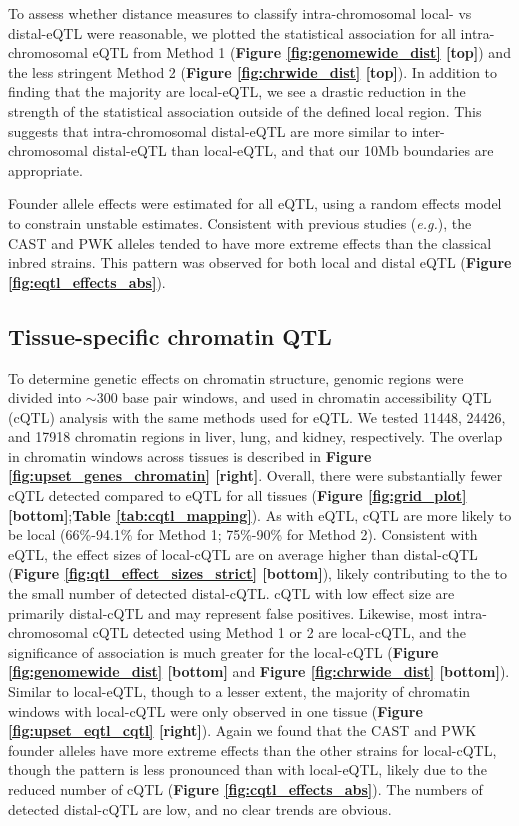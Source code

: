 \documentclass[9pt,twocolumn,twoside]{gsajnl}
\newcommand{\eg}{\emph{e.g.}}
\begin{document}
To assess whether distance measures to classify intra-chromosomal local- vs distal-eQTL were reasonable, we plotted the statistical association for all intra-chromosomal eQTL from Method 1 (\textbf{Figure \ref{fig:genomewide_dist} [top]}) and the less stringent Method 2 (\textbf{Figure \ref{fig:chrwide_dist} [top]}). In addition to finding that the majority are local-eQTL, we see a drastic reduction in the strength of the statistical association outside of the defined local region. This suggests that intra-chromosomal distal-eQTL are more similar to inter-chromosomal distal-eQTL than local-eQTL, and that our 10Mb boundaries are appropriate. 

Founder allele effects were estimated for all eQTL, using a random effects model to constrain unstable estimates. Consistent with previous studies (\eg \citealt{Aylor2011}), the CAST and PWK alleles tended to have more extreme effects than the classical inbred strains. This pattern was observed for both local and distal eQTL (\textbf{Figure \ref{fig:eqtl_effects_abs}}).

\subsection{Tissue-specific chromatin QTL}

To determine genetic effects on chromatin structure, genomic regions were divided into $\sim$300 base pair windows, and used in chromatin accessibility QTL (cQTL) analysis with the same methods used for eQTL. We tested 11448, 24426, and 17918 chromatin regions in liver, lung, and kidney, respectively. The overlap in chromatin windows across tissues is described in \textbf{Figure \ref{fig:upset_genes_chromatin} [right]}. Overall, there were substantially fewer cQTL detected compared to eQTL for all tissues (\textbf{Figure \ref{fig:grid_plot} [bottom]};\textbf{Table \ref{tab:cqtl_mapping}}). As with eQTL, cQTL are more likely to be local (66\%-94.1\% for Method 1; 75\%-90\% for Method 2).
Consistent with eQTL, the effect sizes of local-cQTL are on average higher than distal-cQTL (\textbf{Figure \ref{fig:qtl_effect_sizes_strict} [bottom]}), likely contributing to the to the small number of detected distal-cQTL. cQTL with low effect size are primarily distal-cQTL and may represent false positives. Likewise, most intra-chromosomal cQTL detected using Method 1 or 2 are local-cQTL, and the significance of association is much greater for the local-cQTL  (\textbf{Figure \ref{fig:genomewide_dist} [bottom]} and \textbf{Figure \ref{fig:chrwide_dist} [bottom]}). Similar to local-eQTL, though to a lesser extent, the majority of chromatin windows with local-cQTL were only observed in one tissue (\textbf{Figure \ref{fig:upset_eqtl_cqtl} [right]}).
Again we found that the CAST and PWK founder alleles have more extreme effects than the other strains for local-cQTL, though the pattern is less pronounced than with local-eQTL, likely due to the reduced number of cQTL (\textbf{Figure \ref{fig:cqtl_effects_abs}}). The numbers of detected distal-cQTL are low, and no clear trends are obvious.
\end{document}
